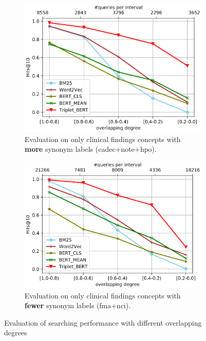 \documentclass[preprint,12pt]{elsarticle}
\begin{document}
\begin{figure}[htbp]
  \begin{subfigure}[b]{0.45\textwidth}
    \includegraphics[width=\textwidth]{figures/cadecqueryhpo.eps}
    \caption{Evaluation on only clinical findings concepts with \textbf{more} synonym labels (cadec+note+hpo).}
    \label{fig:f1}
  \end{subfigure}
  \hfill
  \begin{subfigure}[b]{0.45\textwidth}
    \includegraphics[width=\textwidth]{figures/fmanci.eps}
    \caption{Evaluation on only clinical findings concepts with \textbf{fewer} synonym labels (fma+nci).}
    \label{fig:f2}
  \end{subfigure}
  \caption{Evaluation of searching performance with different overlapping degrees}
  \label{fig:Overlapping}
\end{figure}
\end{document}
